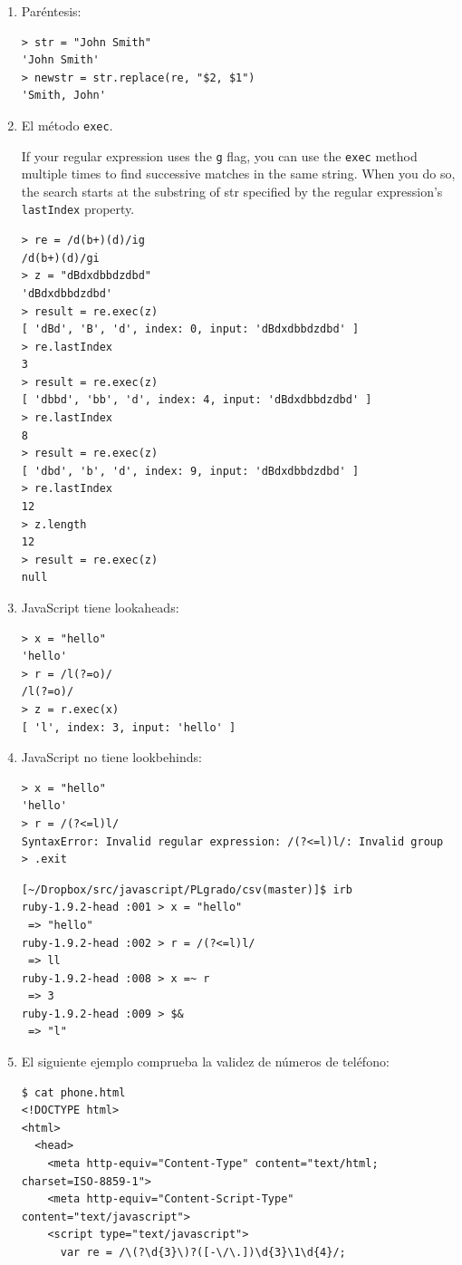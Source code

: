 \begin{enumerate}
\item  Paréntesis:
\begin{verbatim}
> str = "John Smith"
'John Smith'
> newstr = str.replace(re, "$2, $1")
'Smith, John'
\end{verbatim}
\item  El método \verb|exec|.

If your regular expression uses the \verb"g" flag, you can use the \verb|exec|
method multiple times to find successive matches in the same string.
When you do so, the search starts at the substring of str specified
by the regular expression's \verb|lastIndex| property.

\begin{verbatim}
> re = /d(b+)(d)/ig
/d(b+)(d)/gi
> z = "dBdxdbbdzdbd"
'dBdxdbbdzdbd'
> result = re.exec(z)
[ 'dBd', 'B', 'd', index: 0, input: 'dBdxdbbdzdbd' ]
> re.lastIndex
3
> result = re.exec(z)
[ 'dbbd', 'bb', 'd', index: 4, input: 'dBdxdbbdzdbd' ]
> re.lastIndex
8
> result = re.exec(z)
[ 'dbd', 'b', 'd', index: 9, input: 'dBdxdbbdzdbd' ]
> re.lastIndex
12
> z.length
12
> result = re.exec(z)
null
\end{verbatim}
\item JavaScript tiene lookaheads:
\begin{verbatim}
> x = "hello"
'hello'
> r = /l(?=o)/
/l(?=o)/
> z = r.exec(x)
[ 'l', index: 3, input: 'hello' ]
\end{verbatim}
\item JavaScript no tiene lookbehinds:
\begin{verbatim}
> x = "hello"
'hello'
> r = /(?<=l)l/
SyntaxError: Invalid regular expression: /(?<=l)l/: Invalid group
> .exit
\end{verbatim}
\begin{verbatim}
[~/Dropbox/src/javascript/PLgrado/csv(master)]$ irb
ruby-1.9.2-head :001 > x = "hello"
 => "hello" 
ruby-1.9.2-head :002 > r = /(?<=l)l/
 => ll 
ruby-1.9.2-head :008 > x =~ r
 => 3 
ruby-1.9.2-head :009 > $&
 => "l" 
\end{verbatim}
\item 
El siguiente ejemplo comprueba la validez de números de teléfono:
\begin{verbatim}
$ cat phone.html 
<!DOCTYPE html>
<html>  
  <head>  
    <meta http-equiv="Content-Type" content="text/html; charset=ISO-8859-1">  
    <meta http-equiv="Content-Script-Type" content="text/javascript">  
    <script type="text/javascript">  
      var re = /\(?\d{3}\)?([-\/\.])\d{3}\1\d{4}/;  

\end{verbatim}
\end{enumerate}
